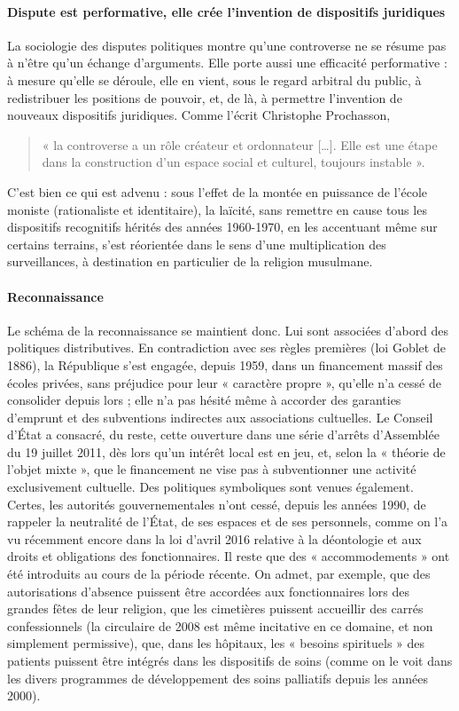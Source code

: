 \paragraph{Dispute est performative, elle crée l'invention de dispositifs juridiques }La sociologie des disputes politiques montre qu’une controverse ne se résume pas à n’être qu’un échange d’arguments. Elle porte aussi une efficacité performative : à mesure qu’elle se déroule, elle en vient, sous le regard arbitral du public, à redistribuer les positions de pouvoir, et, de là, à permettre l’invention de nouveaux dispositifs juridiques. Comme
l’écrit Christophe Prochasson, 
\begin{quote}
« la controverse a un rôle créateur et ordonnateur […]. Elle est une étape dans la construction d’un espace social et culturel, toujours instable ».     
\end{quote}
C’est bien ce qui est advenu : sous l’effet de la montée en puissance de l’école moniste (rationaliste et identitaire), la laïcité, sans remettre en cause tous les dispositifs recognitifs hérités des années 1960-1970, en les accentuant même sur certains terrains, s’est réorientée dans le sens d’une multiplication des surveillances, à destination en particulier de la religion musulmane.
\paragraph{Reconnaissance}
Le schéma de la reconnaissance se maintient donc. Lui sont associées d’abord des politiques distributives. En contradiction avec ses règles premières (loi Goblet de 1886), la République s’est engagée, depuis 1959, dans un financement massif des écoles privées, sans préjudice pour leur
« caractère propre », qu’elle n’a cessé de consolider depuis lors ; elle n’a pas hésité même à accorder des garanties d’emprunt et des subventions indirectes aux associations cultuelles. Le Conseil d’État a consacré, du reste, cette ouverture dans une série d’arrêts d’Assemblée du 19 juillet 2011, dès lors qu’un intérêt local est en jeu, et, selon la « théorie de l’objet mixte », que le financement ne vise pas à subventionner une activité exclusivement cultuelle. Des politiques symboliques sont venues également. Certes, les autorités gouvernementales n’ont cessé, depuis les années 1990, de rappeler la neutralité de l’État, de ses espaces et de ses personnels, comme on l’a vu récemment encore dans la loi d’avril 2016 relative à la déontologie et aux droits et obligations des fonctionnaires. Il reste que des « accommodements » ont été introduits au cours de la période récente. On admet, par exemple, que des autorisations d’absence puissent être accordées aux fonctionnaires lors des grandes fêtes de leur religion, que les cimetières puissent accueillir des carrés confessionnels (la circulaire de 2008 est même incitative en ce domaine, et non simplement permissive), que, dans les hôpitaux, les « besoins spirituels » des patients puissent être intégrés dans les dispositifs de soins (comme on le voit dans les divers programmes de développement des soins palliatifs depuis les années 2000).

